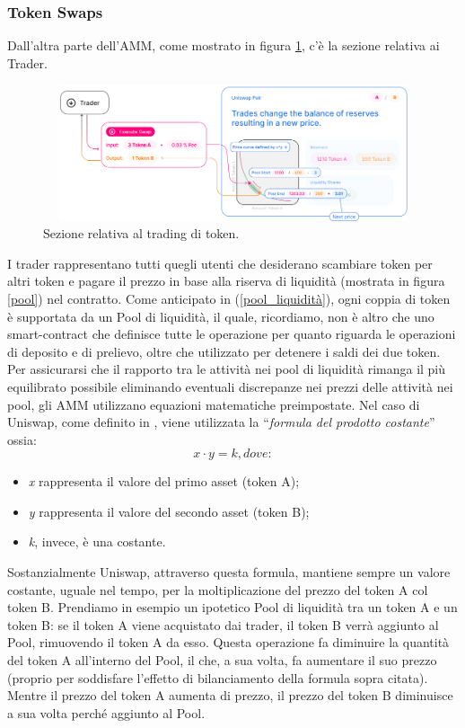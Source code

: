 \subsubsection{Token Swaps}
Dall'altra parte dell'AMM, come mostrato in figura \ref{swap}, c'è la sezione relativa ai Trader.
\begin{figure}[h]
    \centering
    \includegraphics[width=12cm,height=4cm]{Immagini/Swap.png}
    \caption[Rappresentazione grafica del funzionamento relatico al trading di token]{Sezione relativa al trading di token.}
    \label{swap}
\end{figure}
I trader rappresentano tutti quegli utenti che desiderano scambiare token per altri token e pagare il prezzo in base alla riserva di liquidità (mostrata in figura \ref{pool}) nel contratto.
Come anticipato in (\ref{pool_liquidità}), ogni coppia di token è supportata da un Pool di liquidità, il quale, ricordiamo, non è altro che uno smart-contract che definisce tutte le operazione per quanto riguarda le operazioni di deposito e di prelievo, oltre che utilizzato per detenere i saldi dei due token. Per assicurarsi che il rapporto tra le attività nei pool di liquidità rimanga il più equilibrato possibile eliminando eventuali discrepanze nei prezzi delle attività nei pool, gli AMM utilizzano equazioni matematiche preimpostate. Nel caso di Uniswap, come definito in \cite{uniswap_swap}, viene utilizzata la “\textit{formula del prodotto costante}” ossia:
\begin{equation*}
		x \cdot y=k ,dove:
\end{equation*}\begin{itemize}
\item \textit{x} rappresenta il valore del primo asset (token A);
\item \textit{y} rappresenta il valore del secondo asset (token B);
\item \textit{k}, invece, è una costante.
\end{itemize}

Sostanzialmente Uniswap, attraverso questa formula, mantiene sempre un valore costante, uguale nel tempo, per la moltiplicazione del prezzo del token A col token B. Prendiamo in esempio un ipotetico Pool di liquidità tra un token A e un token B: se il token A viene acquistato dai trader, il token B verrà aggiunto al Pool, rimuovendo il token A da esso. Questa operazione fa diminuire la quantità del token A all'interno del Pool, il che, a sua volta, fa aumentare il suo prezzo (proprio per soddisfare l'effetto di bilanciamento della formula sopra citata). Mentre il prezzo del token A aumenta di prezzo, il prezzo del token B diminuisce a sua volta perché aggiunto al Pool.

